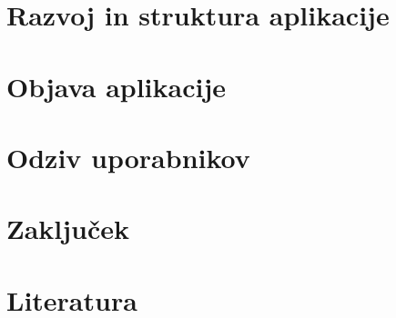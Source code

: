 \documentclass[a4paper, 12pt]{article}
\begin{document}
	\section{Razvoj in struktura aplikacije}
	

	\section{Objava aplikacije}
	

	\section{Odziv uporabnikov}
	
	\pagebreak

	\section{Zaključek}
	
	\pagebreak

	\section{Literatura}
	\printbibliography[heading=none]
	\pagebreak

	
\end{document}
